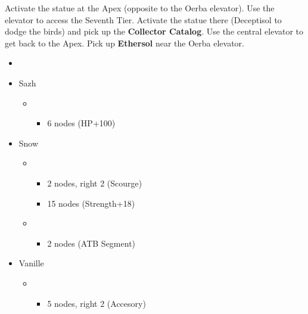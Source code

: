 Activate the statue at the Apex (opposite to the Oerba elevator).
Use the elevator to access the Seventh Tier.
Activate the statue there (Deceptisol to dodge the birds) and pick up the \textbf{Collector Catalog}.
Use the central elevator to get back to the Apex.
Pick up \textbf{Ethersol} near the Oerba elevator.
\vfill
\begin{menu}
	\begin{itemize}
		\paradigm
		\begin{itemize}
			\item {}%
				  {\paradigmline{\syn}{(\rav)}{(\sab)}}%
			      {\paradigmline{\com}{\rav}{\rav}}%
			      {\paradigmline[4]{\rav}{\sen}{(\med)}}%
			      {\paradigmline{\com}{(\sen)}{(\med)}}%
			      {\paradigmline{\rav}{(\rav)}{\sab}}%
			      {\paradigmline{\com}{(\rav)}{(\med)}}%
		\end{itemize}
		\crystarium
		\begin{itemize}
			\item Sazh
				\begin{itemize}
					\item \rav
						\begin{itemize}
							\item 6 nodes (HP+100)
						\end{itemize}
				\end{itemize}
			\item Snow
				\begin{itemize}
					\item \com
						\begin{itemize}
							\item 2 nodes, right 2 (Scourge)
							\item 15 nodes (Strength+18)
						\end{itemize}
					\item \sen
						\begin{itemize}
							\item 2 nodes (ATB Segment)
						\end{itemize}
				\end{itemize}
			\item Vanille
				\begin{itemize}
					\item \med
						\begin{itemize}
							\item 5 nodes, right 2 (Accesory)
						\end{itemize}
				\end{itemize}							      	

\end{itemize}
\end{itemize}
\end{menu}
